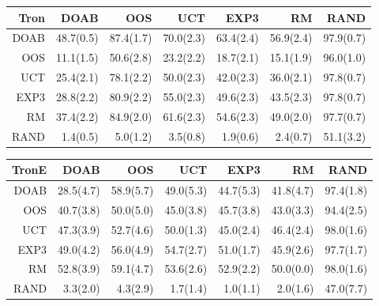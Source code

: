 \begin{figure}
\begin{footnotesize}
\begin{tabular}{|r|rrrrrr|}\hline
Tron&DOAB&OOS&UCT&EXP3&RM&RAND\\\hline
DOAB&48.7(0.5)&87.4(1.7)&70.0(2.3)&63.4(2.4)&56.9(2.4)&97.9(0.7)\\
OOS&11.1(1.5)&50.6(2.8)&23.2(2.2)&18.7(2.1)&15.1(1.9)&96.0(1.0)\\
UCT&25.4(2.1)&78.1(2.2)&50.0(2.3)&42.0(2.3)&36.0(2.1)&97.8(0.7)\\
EXP3&28.8(2.2)&80.9(2.2)&55.0(2.3)&49.6(2.3)&43.5(2.3)&97.8(0.7)\\
RM&37.4(2.2)&84.9(2.0)&61.6(2.3)&54.6(2.3)&49.0(2.0)&97.7(0.7)\\
RAND&1.4(0.5)&5.0(1.2)&3.5(0.8)&1.9(0.6)&2.4(0.7)&51.1(3.2)\\
\hline
\end{tabular}

\begin{tabular}{|r|rrrrrr|}\hline
TronE&DOAB&OOS&UCT&EXP3&RM&RAND\\\hline
DOAB&28.5(4.7)&58.9(5.7)&49.0(5.3)&44.7(5.3)&41.8(4.7)&97.4(1.8)\\
OOS&40.7(3.8)&50.0(5.0)&45.0(3.8)&45.7(3.8)&43.0(3.3)&94.4(2.5)\\
UCT&47.3(3.9)&52.7(4.6)&50.0(1.3)&45.0(2.4)&46.4(2.4)&98.0(1.6)\\
EXP3&49.0(4.2)&56.0(4.9)&54.7(2.7)&51.0(1.7)&45.9(2.6)&97.7(1.7)\\
RM&52.8(3.9)&59.1(4.7)&53.6(2.6)&52.9(2.2)&50.0(0.0)&98.0(1.6)\\
RAND&3.3(2.0)&4.3(2.9)&1.7(1.4)&1.0(1.1)&2.0(1.6)&47.0(7.7)\\
\hline
\end{tabular}


\end{footnotesize}
\end{figure}
